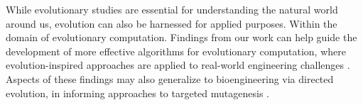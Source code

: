 While evolutionary studies are essential for understanding the natural world around us, evolution can also be harnessed for applied purposes.
Within the domain of evolutionary computation.
Findings from our work can help guide the development of more effective algorithms for evolutionary computation, where evolution-inspired approaches are applied to real-world engineering challenges \citep{holland1992genetic}.
Aspects of these findings may also generalize to bioengineering via directed evolution, in informing approaches to targeted mutagenesis \citep{sandberg2019emergence}.

